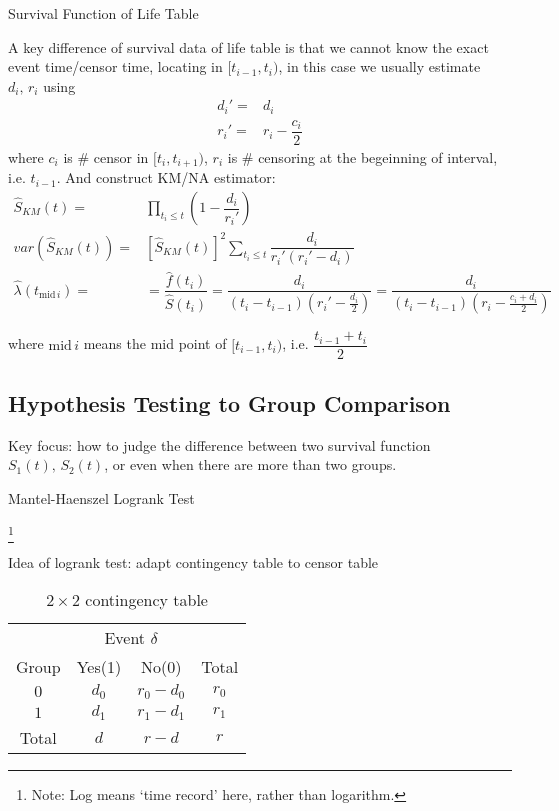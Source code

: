 \begin{point}
    Survival Function of Life Table
\end{point}

A key difference of survival data of life table is that we cannot know the exact event time/censor time, locating in $ [t_{i-1},t_i) $, in this case we usually estimate $ d_i,\,r_i $ using
\begin{align}
    d_i'=&d_i\\
    r_i'=&r_i-\dfrac{c_i}{2}
\end{align}
where $ c_i $ is \# censor in $ [t_i,t_{i+1}) $, $ r_i $ is \# censoring at the begeinning of interval, i.e. $ t_{i-1} $. And construct KM/NA estimator:
\begin{align}
    \hat{S}_{KM}(t)=&\prod_{t_i\leq t}\left( 1-\dfrac{d_i}{r_i'} \right)\\
    var(\hat{S}_{KM}(t))=&\left[\hat{S}_{KM}(t)\right]^2\sum_{t_i\leq t}\dfrac{d_i}{r_i'(r_i'-d_i)}\\
    \hat{\lambda }(t_{\mathrm{mid\,}i })=&=\dfrac{\hat{f}(t_i)}{\hat{S}(t_i)}= \dfrac{d_i}{(t_{i}-t_{i-1})(r_i'-\frac{d_i}{2})}=\dfrac{d_i}{(t_{i}-t_{i-1})(r_i-\frac{c_i+d_i}{2})}
\end{align}

    where $ \mathrm{mid}\,i  $ means the mid point of $ [t_{i-1},t_{i}) $, i.e. $ \dfrac{t_{i-1}+t_{i}}{2} $


\subsection{Hypothesis Testing to Group Comparison}\label{SubSubSectionSurvivalAnalysisGroupComparison}
Key focus: how to judge the difference between two survival function $ S_1(t),\,S_2(t) $, or even when there are more than two groups.

\begin{point}
    Mantel-Haenszel Logrank Test
\end{point}\footnote{Note: Log means `time record' here, rather than logarithm.}

Idea of logrank test: adapt contingency table to censor table
\begin{table}[H]
    \centering
    \renewcommand\arraystretch{1}
    \caption{$ 2\times 2 $ contingency table}
    \begin{tabular}{cccc}
        \hline
        \hline
        &\multicolumn{2}{c}{Event $ \delta  $}&\\
        \cline{2-3}
        Group&Yes(1)&No(0)&Total\\
        \hline
        $ 0 $&$ d_0 $&$ r_0-d_0 $&$ r_0 $\\
        $ 1 $&$ d_1 $&$ r_1-d_1 $&$ r_1 $\\
        \hline
        Total&$ d $&$ r-d $&$ r $\\
        \hline
        \hline
    \end{tabular}
    \label{}
\end{table}

